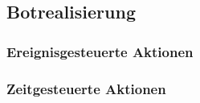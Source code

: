 \subsection{Botrealisierung}
\subsubsection{Ereignisgesteuerte Aktionen}
\subsubsection{Zeitgesteuerte Aktionen}





